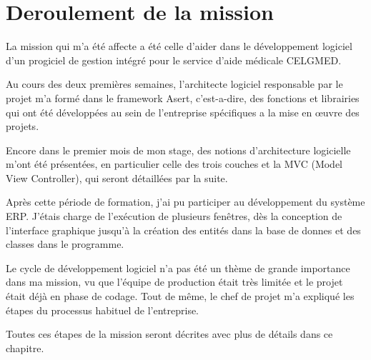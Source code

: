 \chapter{Deroulement de la mission}

La mission qui m'a été affecte a été celle d'aider dans le développement logiciel d'un progiciel de gestion intégré pour le service d'aide médicale CELGMED. 

Au cours des deux premières semaines, l'architecte logiciel responsable par le projet m'a formé dans le framework Asert, c'est-a-dire, des fonctions et librairies qui ont été développées au sein de l'entreprise spécifiques a la mise en œuvre des projets.

Encore dans le premier mois de mon stage, des notions d'architecture logicielle m'ont été présentées, en particulier celle des trois couches et la MVC (Model View Controller), qui seront détaillées par la suite.

Après cette période de formation, j'ai pu participer au développement du système \gls{ERP}. J'étais charge de l'exécution de plusieurs fenêtres, dès la conception de l'interface graphique jusqu'à la création des entités dans la base de donnes et des classes dans le programme.

Le cycle de développement logiciel n'a pas été un thème de grande importance dans ma mission, vu que l'équipe de production était très limitée et le projet était déjà en phase de codage. Tout de même, le chef de projet m'a expliqué les étapes du processus habituel de l'entreprise.

Toutes ces étapes de la mission seront décrites avec plus de détails dans ce chapitre.  




